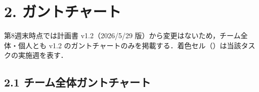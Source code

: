 \documentclass[a4paper,11pt]{ltjsarticle}
\providecommand{\％}{\%}
\begin{document}
\section{2. ガントチャート}

第8週末時点では計画書 v1.2（2026/5/29 版）から変更はないため，チーム全体・個人とも v1.2 のガントチャートのみを掲載する．着色セル（\colorbox{ganttCell}{\phantom{xx}}）は当該タスクの実施週を表す．

\renewcommand{\arraystretch}{1.3}

\begingroup
\setlength{\tabcolsep}{3pt}

\subsection*{2.1 チーム全体ガントチャート}
\end{document}
